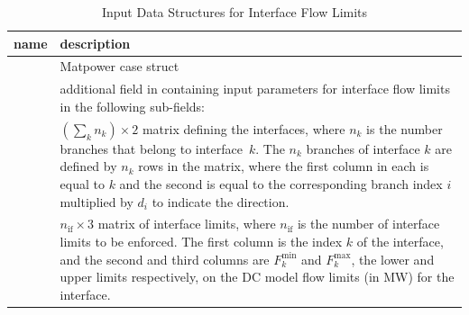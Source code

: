 \documentclass[12pt]{article}
\newcommand{\matpower}[0]{{\sc Matpower}}
\newcommand{\code}[1]{{\relsize{-0.5}{\tt{{#1}}}}}  %
\newcommand{\mpc}[0]{\code{mpc}}
\numberwithin{equation}{section}
\numberwithin{table}{section}
\numberwithin{figure}{section}
\begin{document}
\begin{table}[!ht]
\centering
\begin{threeparttable}
\caption{Input Data Structures for Interface Flow Limits}
\label{tab:ifliminputs}
\footnotesize
\begin{tabular}{lp{}}
\toprule
name & description \\
\midrule
\mpc{}	& \matpower{} case struct \\
\code{~~if}	& additional field in \mpc{} containing input parameters for interface flow limits in the following sub-fields: \\
\code{~~~~map}	& $(\sum_k n_k) \times 2$ matrix defining the interfaces, where $n_k$ is the number branches that belong to interface~$k$. The $n_k$ branches of interface $k$ are defined by $n_k$ rows in the matrix, where the first column in each is equal to $k$ and the second is equal to the corresponding branch index $i$ multiplied by $d_i$ to indicate the direction. \\
\code{~~~~lims}	& $n_\mathrm{if} \times 3$ matrix of interface limits, where $n_\mathrm{if}$ is the number of interface limits to be enforced. The first column is the index $k$ of the interface, and the second and third columns are $F_k^\mathrm{min}$ and $F_k^\mathrm{max}$, the lower and upper limits respectively, on the DC model flow limits (in MW) for the interface. \\
\bottomrule
\end{tabular}
\end{threeparttable}
\end{table}
\end{document}
